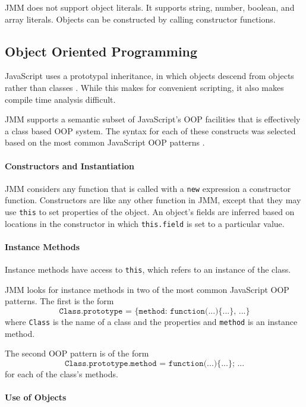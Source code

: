 \documentclass[12pt]{article}
\begin{document}
	JMM does not support object literals. It supports string, number, boolean, and array literals. Objects can be constructed by calling constructor functions. 
	
	\subsection{Object Oriented Programming}
	
	JavaScript uses a prototypal inheritance, in which objects descend from objects rather than classes \cite{mdninheritance}. While this makes for convenient scripting, it also makes compile time analysis difficult.
	
	JMM supports a semantic subset of JavaScript's OOP facilities that is effectively a class based OOP system. The syntax for each of these constructs was selected based on the most common JavaScript OOP patterns \cite{Dugan2015}.
	
	\paragraph{Constructors and Instantiation}
	
	JMM considers any function that is called with a \texttt{new} expression a constructor function. Constructors are like any other function in JMM, except that they may use \texttt{this} to set properties of the object. An object's fields are inferred based on locations in the constructor in which \texttt{this.field} is set to a particular value.
	
	\paragraph{Instance Methods}
	
	Instance methods have access to \texttt{this}, which refers to an instance of the class. 
	
	JMM looks for instance methods in two of the most common JavaScript OOP patterns. The first is the form $$\texttt{Class.prototype = \{method: function(...)\{...\}, ...\}}$$ where \texttt{Class} is the name of a class and the properties and \texttt{method} is an instance method.
	
	The second OOP pattern is of the form $$\texttt{Class.prototype.method = function(...)\{...\}; ...}$$ for each of the class's methods.
	
	\paragraph{Use of Objects}
	
\end{document}
